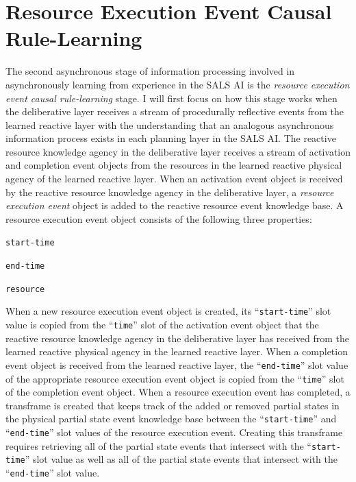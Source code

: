 \section{Resource Execution Event Causal Rule-Learning}
\label{section:resource_execution_event_causal_rule_learning}

The second asynchronous stage of information processing involved in
asynchronously learning from experience in the SALS AI is the
{\emph{resource execution event causal rule-learning}} stage.  I will
first focus on how this stage works when the deliberative layer
receives a stream of procedurally reflective events from the learned
reactive layer with the understanding that an analogous asynchronous
information process exists in each planning layer in the SALS AI.  The
reactive resource knowledge agency in the deliberative layer receives
a stream of activation and completion event objects from the resources
in the learned reactive physical agency of the learned reactive layer.
When an activation event object is received by the reactive resource
knowledge agency in the deliberative layer, a {\emph{resource
    execution event}} object is added to the reactive resource event
knowledge base.  A resource execution event object consists of the
following three properties:
\begin{packed_enumerate}
\item{{\tt{start-time}}}
\item{{\tt{end-time}}}
\item{{\tt{resource}}}
\end{packed_enumerate}
When a new resource execution event object is created, its
``{\tt{start-time}}'' slot value is copied from the ``{\tt{time}}''
slot of the activation event object that the reactive resource
knowledge agency in the deliberative layer has received from the
learned reactive physical agency in the learned reactive layer.  When
a completion event object is received from the learned reactive layer,
the ``{\tt{end-time}}'' slot value of the appropriate resource
execution event object is copied from the ``{\tt{time}}'' slot of the
completion event object.  When a resource execution event has
completed, a transframe \cite[]{minsky:1975} is created that keeps
track of the added or removed partial states in the physical partial
state event knowledge base between the ``{\tt{start-time}}'' and
``{\tt{end-time}}'' slot values of the resource execution event.
Creating this transframe requires retrieving all of the partial state
events that intersect with the ``{\tt{start-time}}'' slot value as
well as all of the partial state events that intersect with the
``{\tt{end-time}}'' slot value.


